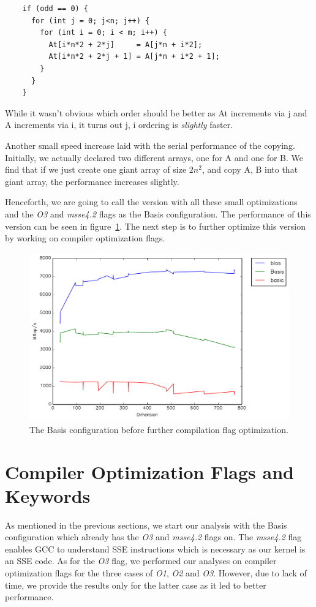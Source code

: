\documentclass{article}
\begin{document}
    
    \begin{lstlisting}
    if (odd == 0) {
      for (int j = 0; j<n; j++) {
        for (int i = 0; i < m; i++) {
          At[i*n*2 + 2*j]     = A[j*n + i*2];
          At[i*n*2 + 2*j + 1] = A[j*n + i*2 + 1];
        }
      }
    }
    \end{lstlisting}

    While it wasn't obvious which order should be better as At increments via j and A increments via i, it turns out j, i ordering is \emph{slightly} faster.

    Another small speed increase laid with the serial performance of the copying. Initially, we actually declared two different arrays, one for A and one for B.
    We find that if we just create one giant array of size $2n^2$, and copy A, B into that giant array, the performance increases slightly.

    Henceforth, we are going to call the version with all these small optimizations and the \textit{O3} and \textit{msse4.2} flags as the Basis configuration. The performance of this version can be seen in figure~\ref{fig:basis}. The next step is to further optimize this version by working on compiler optimization flags. 

    \begin{figure}[h]
      \centering
      \includegraphics[width=.7\textwidth]{Basis.pdf}
      \caption{The Basis configuration before further compilation flag optimization.}
      \label{fig:basis}
    \end{figure}

\section{Compiler Optimization Flags and Keywords}

As mentioned in the previous sections, we start our analysis with the Basis configuration which already has the \textit{O3} and \textit{msse4.2} flags on. The \textit{msse4.2} flag enables GCC to understand SSE instructions which is necessary as our kernel is an SSE code. As for the \textit{O3} flag, we performed our analyses on compiler optimization flags for the three cases of \textit{O1},  \textit{O2} and \textit{O3}. However, due to lack of time, we provide the results only for the latter case as it led to better performance.
\end{document}
